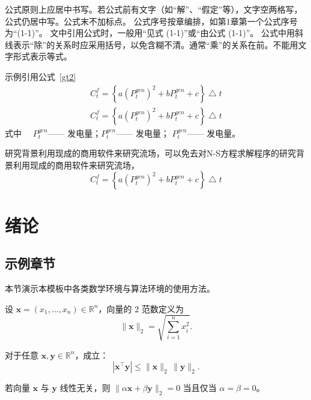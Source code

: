 \documentclass[a4paper, twoside, openany]{NCEPUDoctor}
\begin{document}
  公式原则上应居中书写。若公式前有文字（如“解”、“假定”等），文字空两格写，公式仍居中写。公式末不加标点。
  公式序号按章编排，如第1章第一个公式序号为“(1-1)”。
  文中引用公式时，一般用“见式 (1-1)”或“由公式 (1-1)”。
  公式中用斜线表示“除”的关系时应采用括号，以免含糊不清。通常“乘”的关系在前。不能用文字形式表示等式。

  示例引用公式~\ref{gt2}
  \begin{gather}
      C^f_t=\left \{a(P_t^{gen})^2 + b P_t^{gen}+c\right \} \bigtriangleup t \label{gt2} \\
      C^f_t=\left \{a(P_t^{gen})^2 + b P_t^{gen}+c\right \} \bigtriangleup t \label{gt3}
  \end{gather}
  式中~~  $P_t^{gen}$------ 发电量；\breakwithtilde $P_t^{gen}$------ 发电量；
  \breakwithtilde $P_t^{gen}$------ 发电量。

  研究背景利用现成的商用软件来研究流场，可以免去对N-S方程求解程序的研究背景利用现成的商用软件来研究流场，
  \begin{equation}
   C^f_t=\left \{a(P_t^{gen})^2 + b P_t^{gen}+c\right \} \bigtriangleup t
   \label{gt1}
  \end{equation}
  \clearpage

  \clearpage
  \chapter{绪论} %

  \section{示例章节}

  本节演示本模板中各类数学环境与算法环境的使用方法。

  \begin{definition}[向量范数] %
  设 $\mathbf{x}=(x_1,\dots,x_n)\in\mathbb{R}^n$，向量的 $2$ 范数定义为
  \[
  \|\mathbf{x}\|_2=\sqrt{\sum_{i=1}^n x_i^2}.
  \]
  \end{definition}

  \begin{theorem} %
  对于任意 $\mathbf{x},\mathbf{y}\in\mathbb{R}^n$，成立：
  \[
  |\mathbf{x}^\top \mathbf{y}| \le \|\mathbf{x}\|_2 \, \|\mathbf{y}\|_2.
  \]
  \end{theorem}

  \begin{lemma} %
  若向量 $\mathbf{x}$ 与 $\mathbf{y}$ 线性无关，则 $\|\alpha \mathbf{x} + \beta \mathbf{y}\|_2 = 0$ 当且仅当 $\alpha=\beta=0$。
  \end{lemma}
\end{document}
